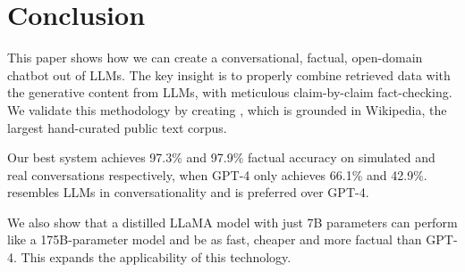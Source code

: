 \section{Conclusion}
This paper shows how we can create a conversational, factual, open-domain chatbot out of LLMs. The key insight is to properly combine retrieved data with the generative content from LLMs, with meticulous claim-by-claim fact-checking. We validate this methodology by creating \system, which is grounded in Wikipedia, the largest hand-curated public text corpus. 

Our best system achieves 97.3\% and 97.9\% factual accuracy on simulated and real conversations respectively, when GPT-4 only achieves 66.1\% and 42.9\%. \system  resembles LLMs in conversationality and is preferred over GPT-4.


We also show that a distilled LLaMA model with just 7B parameters can perform like a 175B-parameter \systemgt model and be as fast, cheaper and more factual than GPT-4. This expands the applicability of this technology.